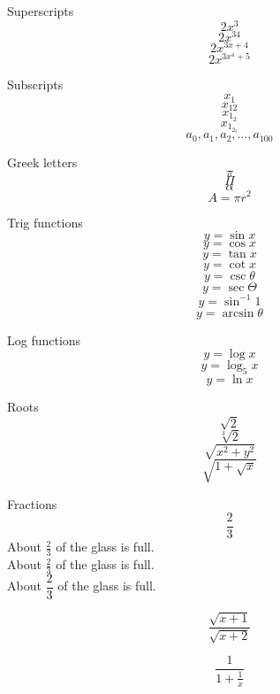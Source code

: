 \documentclass[11pt]{article}
\begin{document}
Superscripts 
$$2x^3$$
$$2x^{34}$$
$$2x^{3x+4}$$
$$2x^{3x^4+5}$$

Subscripts
$$x_1$$
$$x_{12}$$
$$x_{1_2}$$
$$x_{1_{2_3}}$$
$$a_0,a_1,a_2,\ldots,a_{100}$$

Greek letters
$$\pi$$
$$\Pi$$
$$\alpha$$
$$A=\pi r^2$$

Trig functions
$$y=\sin x$$
$$y=\cos x$$
$$y=\tan x$$
$$y=\cot x$$
$$y=\csc \theta$$
$$y=\sec \Theta$$
$$y=\sin^{-1} 1$$
$$y=\arcsin \theta$$

Log functions
$$y=\log x$$
$$y=\log_5 x$$
$$y=\ln x$$

Roots
$$\sqrt{2}$$
$$\sqrt[3]{2}$$
$$\sqrt{x^2+y^2}$$
$$\sqrt{1+\sqrt{x}}$$

Fractions
$$\frac{2}{3}$$
About $\displaystyle\frac{2}{3}$ of the glass is full.\\[16pt]
About $\frac{2}{3}$ of the glass is full.\\[16pt]
About $\dfrac{2}{3}$ of the glass is full.

$$\frac{\sqrt{x+1}}{\sqrt{x+2}}$$

$$\frac{1}{ 1 + \frac{1}{x} }$$
\end{document}
